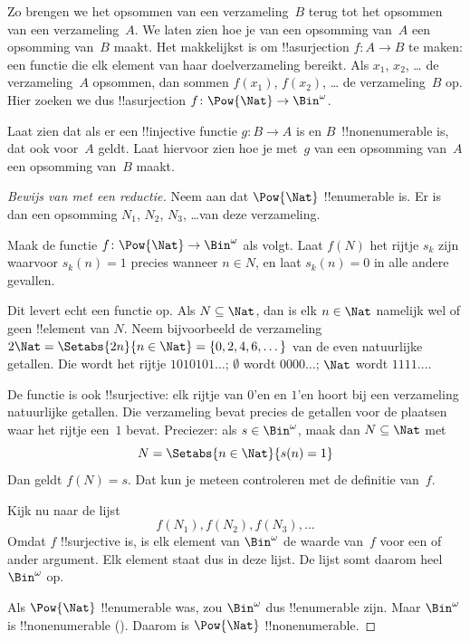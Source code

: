 \documentclass[openany]{memoir}
\begin{document}
Zo brengen we het opsommen van een verzameling~$B$ terug tot het
opsommen van een verzameling~$A$. We laten zien hoe je van een
opsomming van~$A$ een opsomming van~$B$ maakt. Het makkelijkst is om
!!a{surjection} $f\colon A \to B$ te maken: een functie die elk element
van haar doelverzameling bereikt. Als $x_1$, $x_2$, \dots{} de
verzameling~$A$ opsommen, dan sommen $f(x_1)$, $f(x_2)$, \dots{} de
verzameling~$B$ op. Hier zoeken we dus !!a{surjection} $f\colon
\Pow{\Nat} \to \Bin^\omega$.

\begin{prob}
Laat zien dat als er een !!{injective} functie $g\colon B \to A$ is
en $B$~!!{nonenumerable} is, dat ook voor~$A$ geldt. Laat hiervoor
zien hoe je met~$g$ van een opsomming van~$A$ een opsomming van~$B$
maakt.
\end{prob}

\begin{proof}[Bewijs van {} met een reductie]
Neem aan dat $\Pow{\Nat}$ !!{enumerable} is. Er is dan een opsomming
$N_{1}$, $N_{2}$, $N_{3}$, \dots van deze verzameling.

Maak de functie $f \colon \Pow{\Nat} \to \Bin^\omega$ als volgt.
Laat $f(N)$ het rijtje $s_{k}$ zijn waarvoor $s_{k}(n) = 1$ precies
wanneer $n \in N$, en laat $s_k(n) = 0$ in alle andere gevallen.

Dit levert echt een functie op. Als $N \subseteq \Nat$, dan is elk $n
\in \Nat$ namelijk wel of geen !!{element} van $N$. Neem bijvoorbeeld
de verzameling $2\Nat = \Setabs{2n}{n \in \Nat} = \{0,2, 4, 6,
\dots\}$ van de even natuurlijke getallen. Die wordt het rijtje
$1010101\dots$; $\emptyset$ wordt $0000\dots$; $\Nat$ wordt
$1111\dots$.

De functie is ook !!{surjective}: elk rijtje van $0$'en en $1$'en
hoort bij een verzameling natuurlijke getallen. Die verzameling bevat
precies de getallen voor de plaatsen waar het rijtje een~$1$ bevat.
Preciezer: als $s \in \Bin^\omega$, maak dan $N \subseteq \Nat$ met
\[
N = \Setabs{n \in \Nat}{s(n) = 1}
\]
Dan geldt $f(N) = s$. Dat kun je meteen controleren met de definitie
van~$f$.

Kijk nu naar de lijst
\[
f(N_1), f(N_2), f(N_3), \dots
\]
Omdat $f$ !!{surjective} is, is elk element van $\Bin^\omega$ de
waarde van~$f$ voor een of ander argument. Elk element staat dus in
deze lijst. De lijst somt daarom heel~$\Bin^\omega$ op.

Als $\Pow{\Nat}$ !!{enumerable} was, zou $\Bin^\omega$ dus
!!{enumerable} zijn. Maar $\Bin^\omega$ is !!{nonenumerable}
(). Daarom is $\Pow{\Nat}$
!!{nonenumerable}.
\end{proof}
\end{document}
